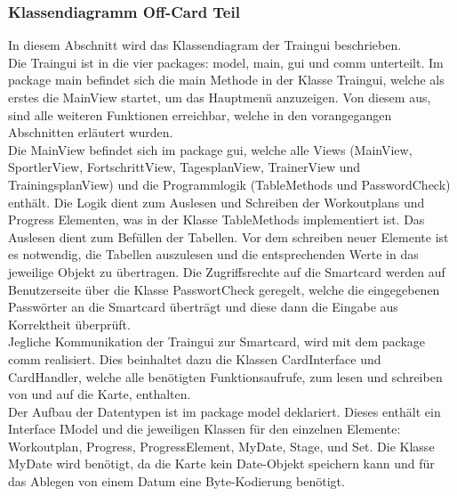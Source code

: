 \subsubsection*{Klassendiagramm Off-Card Teil}

In diesem Abschnitt wird das Klassendiagram der Traingui beschrieben.\\
\newline
Die Traingui ist in die vier packages: model, main, gui und comm unterteilt. Im package main befindet sich die main Methode in der Klasse Traingui, welche als erstes die MainView startet, um das Hauptmenü anzuzeigen. Von diesem aus, sind alle weiteren Funktionen erreichbar, welche in den vorangegangen Abschnitten erläutert wurden.\\
\newline
Die MainView befindet sich im package gui, welche alle Views (MainView, SportlerView, FortschrittView, TagesplanView, TrainerView und TrainingsplanView) und die Programmlogik (TableMethods und PasswordCheck) enthält. Die Logik dient zum Auslesen und Schreiben der Workoutplans und Progress Elementen, was in der Klasse TableMethods implementiert ist. Das Auslesen dient zum Befüllen der Tabellen. Vor dem schreiben neuer Elemente ist es notwendig, die Tabellen auszulesen und die entsprechenden Werte in das jeweilige Objekt zu übertragen. Die Zugriffsrechte auf die Smartcard werden auf Benutzerseite über die Klasse PasswortCheck geregelt, welche die eingegebenen Passwörter an die Smartcard überträgt und diese dann die Eingabe aus Korrektheit überprüft. \\
\newline
Jegliche Kommunikation der Traingui zur Smartcard, wird mit dem package comm realisiert. Dies beinhaltet dazu die Klassen CardInterface und CardHandler, welche alle benötigten Funktionsaufrufe, zum lesen und schreiben von und auf die Karte, enthalten.\\
\newline
Der Aufbau der Datentypen ist im package model deklariert. Dieses enthält ein Interface IModel und die jeweiligen Klassen für den einzelnen Elemente: Workoutplan, Progress, ProgressElement, MyDate, Stage, und Set. Die Klasse MyDate wird benötigt, da die Karte kein Date-Objekt speichern kann und für das Ablegen von einem Datum eine Byte-Kodierung benötigt.


